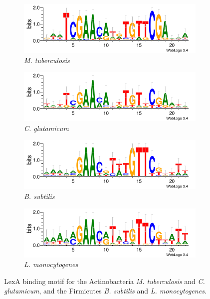 \begin{figure}
  \centering

  \begin{subfigure}{0.4\textwidth}
    \includegraphics[width=\textwidth]{figures/chapter4/mtuberculosis_motif}
    \caption{\textit{M. tuberculosis}}
  \end{subfigure}
  \begin{subfigure}{0.4\textwidth}
    \includegraphics[width=\textwidth]{figures/chapter4/cglutamicum_motif}
    \caption{\textit{C. glutamicum}}
  \end{subfigure}

  \begin{subfigure}{0.4\textwidth}
    \includegraphics[width=\textwidth]{figures/chapter4/bsubtilis_motif}
    \caption{\textit{B. subtilis}}
  \end{subfigure}
  \begin{subfigure}{0.4\textwidth}
    \includegraphics[width=\textwidth]{figures/chapter4/lmonocytogenes_motif}
    \caption{\textit{L. monocytogenes}}
  \end{subfigure}
  \caption{LexA binding motif for the Actinobacteria \textit{M. tuberculosis}
    and \textit{C. glutamicum}, and the Firmicutes \textit{B. subtilis} and
    \textit{L. monocytogenes}.}
  \label{fig:gram-positive-motifs}
\end{figure}

